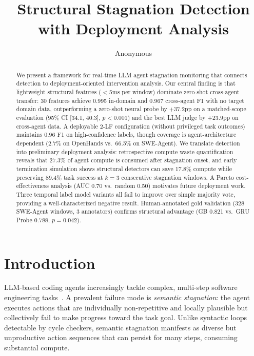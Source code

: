 \documentclass[11pt,a4paper]{article}
\title{Structural Stagnation Detection with Deployment Analysis}
\author{Anonymous}
\begin{document}
\maketitle

\begin{abstract}
We present a framework for real-time LLM agent stagnation monitoring that connects detection to deployment-oriented intervention analysis.
Our central finding is that lightweight structural features ({$<$}5ms per window) dominate zero-shot cross-agent transfer: 30 features achieve 0.995 in-domain and 0.967 cross-agent F1 with no target domain data, outperforming a zero-shot neural probe by +37.2pp on a matched-scope evaluation (95\% CI [34.1, 40.3], $p{<}0.001$) and the best LLM judge by +23.9pp on cross-agent data.
A deployable 2-LF configuration (without privileged task outcomes) maintains 0.96 F1 on high-confidence labels, though coverage is agent-architecture dependent (2.7\% on OpenHands vs.\ 66.5\% on SWE-Agent).
We translate detection into preliminary deployment analysis: retrospective compute waste quantification reveals that 27.3\% of agent compute is consumed after stagnation onset, and early termination simulation shows structural detectors can save 17.8\% compute while preserving 89.4\% task success at $k{=}3$ consecutive stagnation windows.
A Pareto cost-effectiveness analysis (AUC 0.70 vs.\ random 0.50) motivates future deployment work.
Three temporal label model variants all fail to improve over simple majority vote, providing a well-characterized negative result.
Human-annotated gold validation (328 SWE-Agent windows, 3 annotators) confirms structural advantage (GB 0.821 vs.\ GRU Probe 0.788, $p{=}0.042$).
\end{abstract}

\section{Introduction}
\label{sec:intro}

LLM-based coding agents increasingly tackle complex, multi-step software engineering tasks~\cite{yang2024swe,wang2024opendevin}. A prevalent failure mode is \emph{semantic stagnation}: the agent executes actions that are individually non-repetitive and locally plausible but collectively fail to make progress toward the task goal. Unlike syntactic loops detectable by cycle checkers, semantic stagnation manifests as diverse but unproductive action sequences that can persist for many steps, consuming substantial compute.
\end{document}
